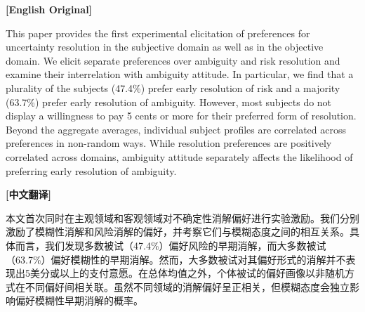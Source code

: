 \documentclass[12pt,a4paper]{ctexart}
\newenvironment{original}{%
  \par\medskip\noindent\textbf{[English Original]}\par\smallskip
  \color{black}\small
}{%
  \par\medskip
}
\newenvironment{translation}{%
  \par\noindent\textbf{[中文翻译]}\par\smallskip
  \color{blue}\small
}{%
  \par\bigskip
}
\theoremstyle{definition}
\theoremstyle{remark}
\begin{document}
\begin{original}
This paper provides the first experimental elicitation of preferences for uncertainty resolution in the subjective domain as well as in the objective domain. We elicit separate preferences over ambiguity and risk resolution and examine their interrelation with ambiguity attitude. In particular, we find that a plurality of the subjects (47.4\%) prefer early resolution of risk and a majority (63.7\%) prefer early resolution of ambiguity. However, most subjects do not display a willingness to pay 5 cents or more for their preferred form of resolution. Beyond the aggregate averages, individual subject profiles are correlated across preferences in non-random ways. While resolution preferences are positively correlated across domains, ambiguity attitude separately affects the likelihood of preferring early resolution of ambiguity.
\end{original}
\begin{translation}
本文首次同时在主观领域和客观领域对不确定性消解偏好进行实验激励。我们分别激励了模糊性消解和风险消解的偏好，并考察它们与模糊态度之间的相互关系。具体而言，我们发现多数被试（47.4\%）偏好风险的早期消解，而大多数被试（63.7\%）偏好模糊性的早期消解。然而，大多数被试对其偏好形式的消解并不表现出5美分或以上的支付意愿。在总体均值之外，个体被试的偏好画像以非随机方式在不同偏好间相关联。虽然不同领域的消解偏好呈正相关，但模糊态度会独立影响偏好模糊性早期消解的概率。
\end{translation}
\end{document}
